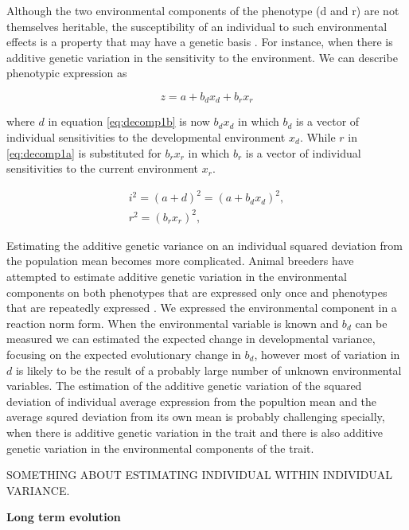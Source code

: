 \documentclass{article}
\begin{document}
Although the two environmental components of the phenotype (d and r) are not themselves heritable, the susceptibility of an individual to such environmental effects is a property that may have a genetic basis \citep{Bull1987}. For instance, when there is additive genetic variation in the sensitivity to the environment. We can describe phenotypic expression as 

\begin{equation} \label{eq:decomp2}
z=a + b_d x_d + b_r x_r
\end{equation}

where $d$ in equation \ref{eq:decomp1b} is now $b_d x_d$ in which $b_d$ is a vector of individual sensitivities to the developmental environment $x_d$. While $r$ in \ref{eq:decomp1a} is substituted for $b_r x_r$ in which $b_r$ is a vector of individual sensitivities to the current environment $x_r$. 

\begin{subequations} 
	\begin{gather}
	i^2 = (a + d)^2=(a + b_d x_d)^2, \label{eq:decomp3a} \\
	r^2 = (b_rx_r)^2 ,               \label{eq:decomp3b}
	\end{gather}
\end{subequations}

Estimating the additive genetic variance on an individual squared deviation from the population mean becomes more complicated. Animal breeders have attempted to estimate additive genetic variation in the environmental components on both phenotypes that are expressed only once and phenotypes that are repeatedly expressed \citep{Hill2010}. We expressed the environmental component in a reaction norm form. When the environmental variable is known and $b_d$ can be measured we can estimated the expected change in developmental variance, focusing on the expected evolutionary change in $b_d$, however most of variation in $d$ is likely to be the result of a probably large number of unknown environmental variables. The estimation of the additive genetic variation of the squared deviation of individual average expression from the popultion mean and the average squred deviation from its own mean is probably challenging specially, when there is additive genetic variation in the trait and there is also additive genetic variation in the environmental components of the trait.

SOMETHING ABOUT ESTIMATING INDIVIDUAL WITHIN INDIVIDUAL VARIANCE.

\bigskip
\noindent\textbf{Long term evolution}
\end{document}
